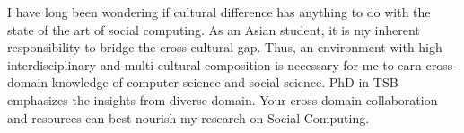 \noindent
I have long been wondering if cultural difference has anything to do with the state of the art of social computing. 
As an Asian student, it is my inherent responsibility to bridge the cross-cultural gap. 
Thus, 
an environment with high interdisciplinary and multi-cultural composition is necessary for me to earn cross-domain knowledge of computer science and social science. 
PhD in TSB emphasizes the insights from diverse domain. 
Your cross-domain collaboration and resources can best nourish my research on Social Computing. 
			


%
%


